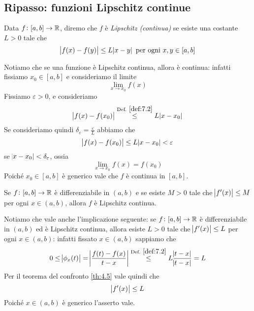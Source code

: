 \subsection{Ripasso: funzioni Lipschitz continue}
\begin{definition}
    \label{def:7.2}
    Data $f\colon[a,b]\to \amsbb{R}$, diremo che $f$ è \emph{Lipschitz (continua)} se esiste una costante $L>0$ tale che
    \[
    \abs{f(x)-f(y)}\le L \abs{x-y} \ \text{per ogni} \ x,y\in[a,b]
    \]
\end{definition}
\begin{remark}
    Notiamo che se una funzione è Lipschitz continua, allora è continua: infatti fissiamo $x_0\in[a,b]$ e consideriamo il limite 
    \[
    \lim_{x\to x_0} f(x)
    \]
    Fissiamo $\varepsilon>0$, e consideriamo
    \[
    \abs{f(x)-f(x_0)}\overset{\text{Def.} \ \ref{def:7.2}}{\le}  L\abs{x-x_0}
    \]
    Se consideriamo quindi $\delta_\varepsilon = \frac{\varepsilon}{L}$ abbiamo che
    \[
    \abs{f(x)-f(x_0)}\le L \abs{x-x_0}<\varepsilon
    \]
    se $\abs{x-x_0}<\delta_\varepsilon$, ossia 
    \[
    \lim_{x\to x_0} f(x) = f(x_0)
    \]
    Poiché $x_0\in[a,b]$ è generico vale che $f$ è continua in $[a,b]$.
\end{remark}
\begin{theorem}
    \label{th:7.4}
    Se $f\colon[a,b]\to \amsbb{R}$ è differenziabile in $(a,b)$ e se esiste $M> 0$ tale che $\abs{f'(x)}\le M$ per ogni $x\in(a,b)$, allora $f$ è Lipschitz continua.
\end{theorem}
\begin{remark}
    Notiamo che vale anche l'implicazione seguente: se $f\colon[a,b]\to \amsbb{R}$ è differenziabile in $(a,b)$ ed è Lipschitz continua, allora esiste $L>0$ tale che $\abs{f'(x)}\le L$ per ogni $x\in(a,b)$: infatti fissato $x\in(a,b)$ sappiamo che
    \[
    0\le \abs{\phi_x(t)} = \abs{\frac{f(t)-f(x)}{t-x}} \overset{\text{Def.} \ \ref{def:7.2}}{\le } L \frac{\abs{t-x}}{\abs{t-x}} = L
    \]
    Per il teorema del confronto \ref{th:4.5} vale quindi che
    \[
    \abs{f'(x)}\le L
    \]
    Poiché $x\in(a,b)$ è generico l'asserto vale.
\end{remark}
